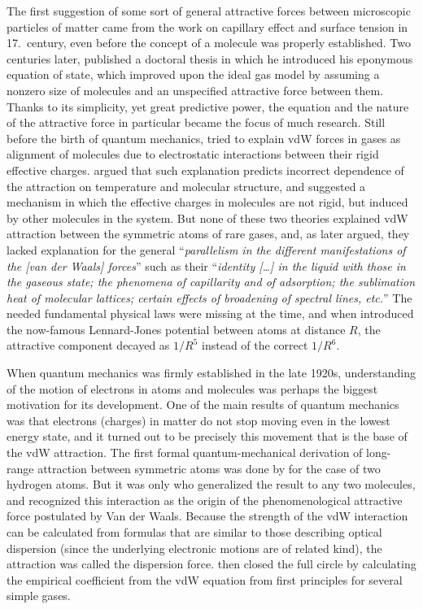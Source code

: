The first suggestion of some sort of general attractive forces between microscopic particles of matter came from the work on capillary effect and surface tension in 17.\ century, even before the concept of a molecule was properly established.
Two centuries later, \citet{vanderWaals73} published a doctoral thesis in which he introduced his eponymous equation of state, which improved upon the ideal gas model by assuming a nonzero size of molecules and an unspecified attractive force between them.
Thanks to its simplicity, yet great predictive power, the equation and the nature of the attractive force in particular became the focus of much research.
Still before the birth of quantum mechanics, \citet{KeesomPK12a} tried to explain vdW forces in gases as alignment of molecules due to electrostatic interactions between their rigid effective charges.
\citet{DebyePZ20} argued that such explanation predicts incorrect dependence of the attraction on temperature and molecular structure, and suggested a mechanism in which the effective charges in molecules are not rigid, but induced by other molecules in the system.
But none of these two theories explained vdW attraction between the symmetric atoms of rare gases, and, as \citet{LondonTFS37} later argued, they lacked explanation for the general ``\emph{parallelism in the different manifestations of the \emph{[van der Waals]} forces}'' such as their ``\emph{identity \emph{[\ldots]} in the liquid with those in the gaseous state; the phenomena of capillarity and of adsorption; the sublimation heat of molecular lattices; certain effects of broadening of spectral lines, etc.}''
The needed fundamental physical laws were missing at the time, and when \citet{JonesPRSLA24} introduced the now-famous Lennard-Jones potential between atoms at distance $R$, the attractive component decayed as $1/R^5$ instead of the correct $1/R^6$.

When quantum mechanics was firmly established in the late 1920s, understanding of the motion of electrons in atoms and molecules was perhaps the biggest motivation for its development.
One of the main results of quantum mechanics was that electrons (charges) in matter do not stop moving even in the lowest energy state, and it turned out to be precisely this movement that is the base of the vdW attraction.
The first formal quantum-mechanical derivation of long-range attraction between symmetric atoms was done by \citet{WangPZ27} for the case of two hydrogen atoms.
But it was only \citet{LondonZP30} who generalized the result to any two molecules, and recognized this interaction as the origin of the phenomenological attractive force postulated by Van der Waals.
Because the strength of the vdW interaction can be calculated from formulas that are similar to those describing optical dispersion (since the underlying electronic motions are of related kind), the attraction was called the dispersion force.
\citet{SlaterPR31} then closed the full circle by calculating the empirical coefficient from the vdW equation from first principles for several simple gases.

